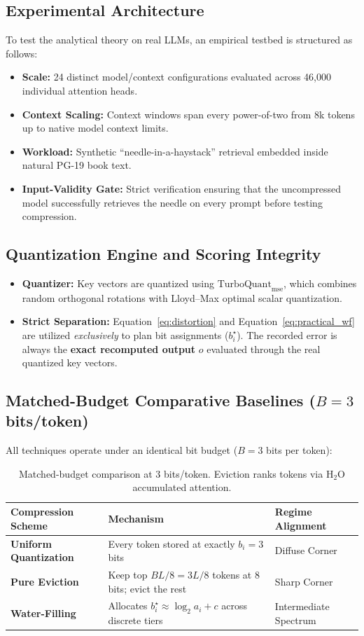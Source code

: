 \subsection{Experimental Architecture}
To test the analytical theory on real LLMs, an empirical testbed is structured as follows:
\begin{itemize}
    \item \textbf{Scale:} 24 distinct model/context configurations evaluated across 46,000 individual attention heads.
    \item \textbf{Context Scaling:} Context windows span every power-of-two from 8k tokens up to native model context limits.
    \item \textbf{Workload:} Synthetic ``needle-in-a-haystack'' retrieval embedded inside natural PG-19 book text.
    \item \textbf{Input-Validity Gate:} Strict verification ensuring that the uncompressed model successfully retrieves the needle on every prompt before testing compression.
\end{itemize}

\subsection{Quantization Engine and Scoring Integrity}
\begin{itemize}
    \item \textbf{Quantizer:} Key vectors are quantized using $\mathrm{TurboQuant}_{\mathrm{mse}}$, which combines random orthogonal rotations with Lloyd--Max optimal scalar quantization.
    \item \textbf{Strict Separation:} Equation~\eqref{eq:distortion} and Equation~\eqref{eq:practical_wf} are utilized \emph{exclusively} to plan bit assignments ($b_i^\star$). The recorded error is always the \textbf{exact recomputed output} $o$ evaluated through the real quantized key vectors.
\end{itemize}

\subsection{Matched-Budget Comparative Baselines ($B = 3$ bits/token)}
All techniques operate under an identical bit budget ($B = 3$ bits per token):
\begin{table}[h]
\centering
\small
\begin{tabular}{@{}lll@{}}
\toprule
\textbf{Compression Scheme} & \textbf{Mechanism} & \textbf{Regime Alignment} \\
\midrule
\textbf{Uniform Quantization} & Every token stored at exactly $b_i = 3$ bits & Diffuse Corner \\
\textbf{Pure Eviction} & Keep top $BL/8 = 3L/8$ tokens at 8 bits; evict the rest & Sharp Corner \\
\textbf{Water-Filling} & Allocates $b_i^\star \approx \log_2 a_i + c$ across discrete tiers & Intermediate Spectrum \\
\bottomrule
\end{tabular}
\caption{Matched-budget comparison at 3 bits/token. Eviction ranks tokens via $\text{H}_2\text{O}$ accumulated attention.}
\label{tab:baselines}
\end{table}

